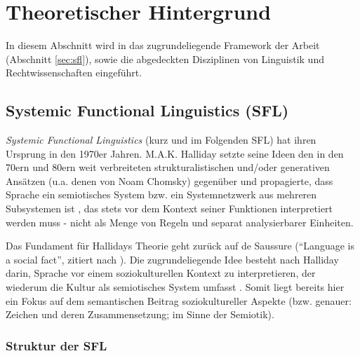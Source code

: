 \section{Theoretischer Hintergrund}\label{sec:2}

In diesem Abschnitt wird in das zugrundeliegende Framework der Arbeit (Abschnitt \ref{sec:sfl}), sowie die abgedeckten Disziplinen von Linguistik und Rechtwissenschaften eingeführt.


\subsection{Systemic Functional Linguistics (SFL)}\label{sec:2:sfl}

\textit{Systemic Functional Linguistics} (kurz und im Folgenden SFL) hat ihren Ursprung in den 1970er Jahren. M.A.K. Halliday setzte seine Ideen den in den 70ern und 80ern weit verbreiteten strukturalistischen und/oder generativen Ansätzen (u.a. denen von Noam Chomsky) gegenüber und propagierte, dass Sprache ein semiotisches System bzw. ein Systemnetzwerk aus mehreren Subsystemen ist \citep{Halliday1978}, das stets vor dem Kontext seiner Funktionen interpretiert werden muss - nicht als Menge von Regeln und separat analysierbarer Einheiten.

Das Fundament für Hallidays Theorie geht zurück auf de Saussure (``Language is a social fact'', zitiert nach \citet[1]{Halliday1978}). Die zugrundeliegende Idee besteht nach Halliday darin, Sprache vor einem soziokulturellen Kontext zu interpretieren, der wiederum die Kultur als semiotisches System umfasst \citep[2]{Halliday1978}. Somit liegt bereits hier ein Fokus auf dem semantischen Beitrag soziokultureller Aspekte (bzw. genauer: Zeichen und deren Zusammensetzung; im Sinne der Semiotik).


\subsubsection{Struktur der SFL}

